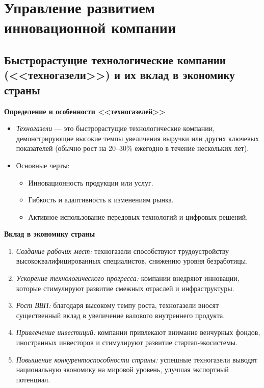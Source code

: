 \section{Управление развитием инновационной компании}

\subsection{Быстрорастущие технологические компании  (<<техногазели>>) и их вклад в экономику страны}

\textbf{Определение и особенности <<техногазелей>>}
\begin{itemize}
    \item \textit{Техногазели} --- это быстрорастущие технологические компании, демонстрирующие высокие темпы увеличения выручки или других ключевых показателей (обычно рост на 20–30\% ежегодно в течение нескольких лет).
    \item Основные черты:
        \begin{itemize}
            \item Инновационность продукции или услуг.
            \item Гибкость и адаптивность к изменениям рынка.
            \item Активное использование передовых технологий и цифровых решений.
        \end{itemize}
\end{itemize}

\textbf{Вклад в экономику страны}
\begin{enumerate}
    \item \textit{Создание рабочих мест:} техногазели способствуют трудоустройству высококвалифицированных специалистов, снижению уровня безработицы.
    \item \textit{Ускорение технологического прогресса:} компании внедряют инновации, которые стимулируют развитие смежных отраслей и инфраструктуры.
    \item \textit{Рост ВВП:} благодаря высокому темпу роста, техногазели вносят существенный вклад в увеличение валового внутреннего продукта.
    \item \textit{Привлечение инвестиций:} компании привлекают внимание венчурных фондов, иностранных инвесторов и стимулируют развитие стартап-экосистемы.
    \item \textit{Повышение конкурентоспособности страны:} успешные техногазели выводят национальную экономику на мировой уровень, улучшая экспортный потенциал.
\end{enumerate}

